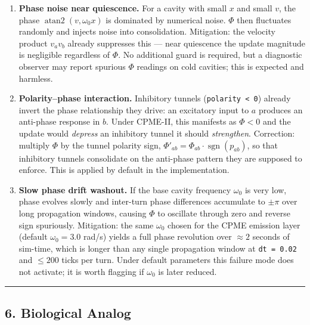 \documentclass[
  11pt,
  a4paper,
]{article}
\begin{document}
\begin{enumerate}
\def\labelenumi{\arabic{enumi}.}
\item
  \textbf{Phase noise near quiescence.} For a cavity with small \(x\)
  and small \(v\), the phase \(\operatorname{atan2}(v, \omega_0 x)\) is
  dominated by numerical noise. \(\Phi\) then fluctuates randomly and
  injects noise into consolidation. Mitigation: the velocity product
  \(v_a v_b\) already suppresses this --- near quiescence the update
  magnitude is negligible regardless of \(\Phi\). No additional guard is
  required, but a diagnostic observer may report spurious \(\Phi\)
  readings on cold cavities; this is expected and harmless.
\item
  \textbf{Polarity--phase interaction.} Inhibitory tunnels
  (\texttt{polarity\ \textless{}\ 0}) already invert the phase
  relationship they drive: an excitatory input to \(a\) produces an
  anti-phase response in \(b\). Under CPME-II, this manifests as
  \(\Phi < 0\) and the update would \emph{depress} an inhibitory tunnel
  it should \emph{strengthen}. Correction: multiply \(\Phi\) by the
  tunnel polarity sign,
  \(\Phi'_{ab} = \Phi_{ab} \cdot \operatorname{sgn}(p_{ab})\), so that
  inhibitory tunnels consolidate on the anti-phase pattern they are
  supposed to enforce. This is applied by default in the implementation.
\item
  \textbf{Slow phase drift washout.} If the base cavity frequency
  \(\omega_0\) is very low, phase evolves slowly and inter-turn phase
  differences accumulate to \(\pm \pi\) over long propagation windows,
  causing \(\Phi\) to oscillate through zero and reverse sign
  spuriously. Mitigation: the same \(\omega_0\) chosen for the CPME
  emission layer (default \(\omega_0 = 3.0\) rad/s) yields a full phase
  revolution over \(\approx 2\) seconds of sim-time, which is longer
  than any single propagation window at \texttt{dt\ =\ 0.02} and
  \(\leq 200\) ticks per turn. Under default parameters this failure
  mode does not activate; it is worth flagging if \(\omega_0\) is later
  reduced.
\end{enumerate}

\begin{center}\rule{0.5\linewidth}{0.5pt}\end{center}

\subsection{6. Biological Analog}\label{biological-analog}
\end{document}
